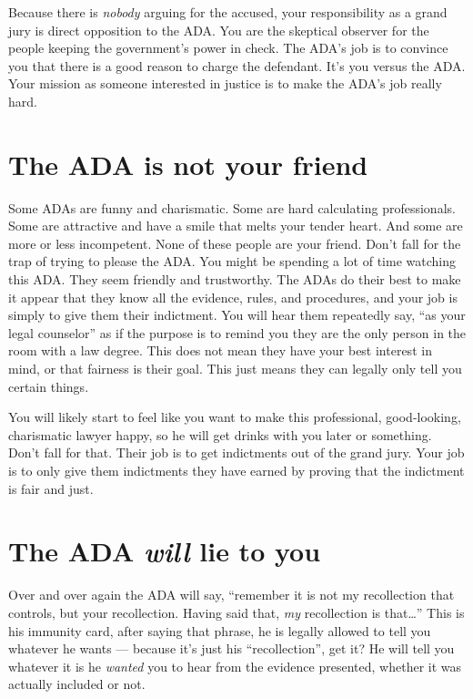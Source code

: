 \documentclass[letterpaper]{article}
\begin{document}
Because there is \emph{nobody} arguing for the accused, your responsibility as a grand jury is direct opposition to the ADA.
You are the skeptical observer for the people keeping the government's power in check. 
The ADA's job is to convince you that there is a good reason to charge the defendant. 
It's you versus the ADA. 
Your mission as someone interested in justice is to make the ADA's job really hard.

\section*{The ADA is not your friend}
Some ADAs are funny and charismatic. 
Some are hard calculating professionals. 
Some are attractive and have a smile that melts your tender heart. 
And some are more or less incompetent. 
None of these people are your friend. 
Don't fall for the trap of trying to please the ADA. 
You might be spending a lot of time watching this ADA.
They seem friendly and trustworthy. 
The ADAs do their best to make it appear that they know all the evidence, rules, and procedures, and your job is simply to give them their indictment. 
You will hear them repeatedly say, ``as your legal counselor'' as if the purpose is to remind you they are the only person in the room with a law degree. 
This does not mean they have your best interest in mind, or that fairness is their goal. 
This just means they can legally only tell you certain things. 

You will likely start to feel like you want to make this professional, good-looking, charismatic lawyer happy, so he will get drinks with you later or something. 
Don't fall for that. 
Their job is to get indictments out of the grand jury. 
Your job is to only give them indictments they have earned by proving that the indictment is fair and just.

\section*{The ADA \emph{will} lie to you}
Over and over again the ADA will say, ``remember it is not my recollection that controls, but your recollection.  Having said that, \emph{my} recollection is that\ldots''
This is his immunity card, after saying that phrase, he is legally allowed to tell you whatever he wants --- because it's just his ``recollection'', get it?
He will tell you whatever it is he \emph{wanted} you to hear from the evidence presented, whether it was actually included or not. 
\end{document}
